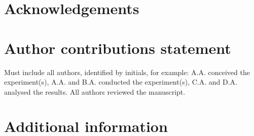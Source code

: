\documentclass[fleqn,10pt]{wlscirep}
\begin{document}








\section*{Acknowledgements}


\section*{Author contributions statement}

Must include all authors, identified by initials, for example:
A.A. conceived the experiment(s),  A.A. and B.A. conducted the experiment(s), C.A. and D.A. analysed the results.  All authors reviewed the manuscript. 

\section*{Additional information}

\end{document}
